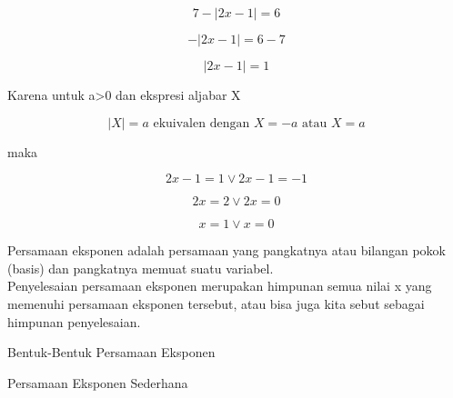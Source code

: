 \begin{eulernotebook}
\begin{eulercomment}
\begin{eulercomment}
\begin{eulercomment}
\end{eulercomment}
\begin{eulerformula}
\[
7-\left | 2x-1 \right |=6
\]
\end{eulerformula}
\begin{eulerformula}
\[
-\left | 2x-1 \right |=6-7
\]
\end{eulerformula}
\begin{eulerformula}
\[
\left | 2x-1 \right |=1
\]
\end{eulerformula}
\begin{eulercomment}
Karena untuk a\textgreater{}0 dan ekspresi aljabar X

\end{eulercomment}
\begin{eulerformula}
\[
\left | X \right |=a \text{ ekuivalen dengan } X = -a \text{ atau  } X=a
\]
\end{eulerformula}
\begin{eulercomment}
maka

\end{eulercomment}
\begin{eulerformula}
\[
2x-1=1 \vee 2x-1=-1
\]
\end{eulerformula}
\begin{eulerformula}
\[
2x=2 \vee 2x=0
\]
\end{eulerformula}
\begin{eulerformula}
\[
x=1 \vee x=0
\]
\end{eulerformula}
\begin{eulercomment}
\end{eulercomment}
\begin{eulercomment}
Persamaan eksponen adalah persamaan yang pangkatnya atau bilangan
pokok (basis) dan pangkatnya memuat suatu variabel.\\
Penyelesaian persamaan eksponen merupakan himpunan semua nilai x yang
memenuhi persamaan eksponen tersebut, atau bisa juga kita sebut
sebagai himpunan penyelesaian.

Bentuk-Bentuk Persamaan Eksponen

Persamaan Eksponen Sederhana


\end{eulercomment}
\end{eulercomment}
\end{eulercomment}
\end{eulernotebook}
